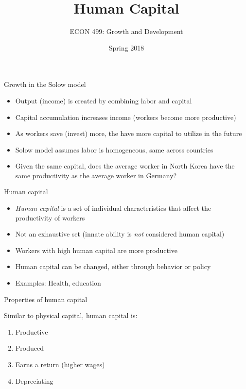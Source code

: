 \documentclass[10pt]{beamer}
\author{ECON 499: Growth and Development}
\date{Spring 2018}
\title{Human Capital}
\begin{document}
\maketitle

\begin{frame}[label={sec:org2b5530b}]{}
\alert{Growth in the Solow model}
\begin{itemize}
\item Output (income) is created by combining labor and capital
\item Capital accumulation increases income (workers become more productive)
\item As workers save (invest) more, the have more capital to utilize in the future
\item Solow model assumes labor is homogeneous, same across countries
\item Given the same capital, does the average worker in North Korea have the same productivity as the average worker in Germany?
\end{itemize}
\end{frame}

\begin{frame}[label={sec:orgbc1c7b6}]{}
\alert{Human capital}
\begin{itemize}
\item \emph{Human capital} is a set of individual characteristics that affect the productivity of workers
\item Not an exhaustive set (innate ability is \emph{not} considered human capital)
\item Workers with high human capital are more productive
\item Human capital can be changed, either through behavior or policy
\item Examples: Health, education
\end{itemize}
\end{frame}

\begin{frame}[label={sec:orgad59ee4}]{}
\alert{Properties of human capital}

Similar to physical capital, human capital is:
\begin{enumerate}
\item Productive
\item Produced
\item Earns a return (higher wages)
\item Depreciating
\end{enumerate}
\end{frame}
\end{document}
